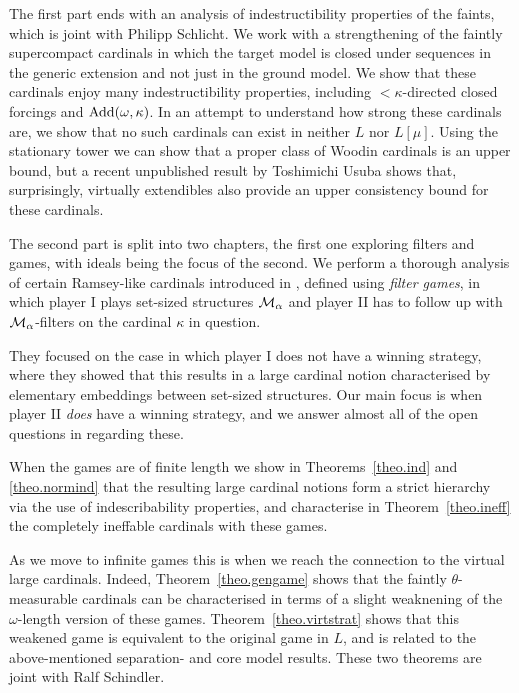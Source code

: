 \documentclass[../main]{subfiles}
\begin{document}
\begin{onehalfspacing}
\quad The first part ends with an analysis of indestructibility properties of the faints, which is joint with Philipp Schlicht. We work with a strengthening of the faintly supercompact cardinals in which the target model is closed under sequences in the generic extension and not just in the ground model. We show that these cardinals enjoy many indestructibility properties, including ${<}\kappa$-directed closed forcings and $\operatorname{Add}(\omega,\kappa)$. In an attempt to understand how strong these cardinals are, we show that no such cardinals can exist in neither $L$ nor $L[\mu]$. Using the stationary tower we can show that a proper class of Woodin cardinals is an upper bound, but a recent unpublished result by Toshimichi Usuba shows that, surprisingly, virtually extendibles also provide an upper consistency bound for these cardinals.

\quad The second part is split into two chapters, the first one exploring filters and games, with ideals being the focus of the second. We perform a thorough analysis of certain Ramsey-like cardinals introduced in \cite{HolySchlicht}, defined using \textit{filter games}, in which player I plays set-sized structures $\operatorname{\mathcal M}_\alpha$ and player II has to follow up with $\operatorname{\mathcal M}_\alpha$-filters on the cardinal $\kappa$ in question.

\quad They focused on the case in which player I does not have a winning strategy, where they showed that this results in a large cardinal notion characterised by elementary embeddings between set-sized structures. Our main focus is when player II \textit{does} have a winning strategy, and we answer almost all of the open questions in \cite{HolySchlicht} regarding these.

\quad When the games are of finite length we show in Theorems~\ref{theo.ind} and \ref{theo.normind} that the resulting large cardinal notions form a strict hierarchy via the use of indescribability properties, and characterise in Theorem~\ref{theo.ineff} the completely ineffable cardinals with these games.

\quad As we move to infinite games this is when we reach the connection to the virtual large cardinals. Indeed, Theorem~\ref{theo.gengame} shows that the faintly $\theta$-measurable cardinals can be characterised in terms of a slight weaknening of the $\omega$-length version of these games. Theorem~\ref{theo.virtstrat} shows that this weakened game is equivalent to the original game in $L$, and is related to the above-mentioned separation- and core model results. These two theorems are joint with Ralf Schindler. 


\end{onehalfspacing}
\end{document}
